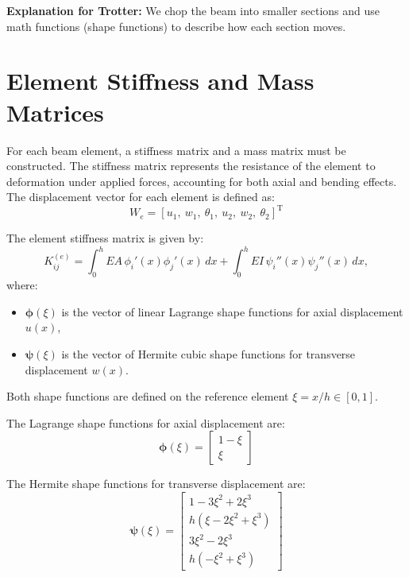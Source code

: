 \documentclass{article}
\begin{document}
	\textbf{Explanation for Trotter:} We chop the beam into smaller sections and use math functions (shape functions) to describe how each section moves.
	
	\section*{Element Stiffness and Mass Matrices}
	
	For each beam element, a stiffness matrix and a mass matrix must be constructed. The stiffness matrix represents the resistance of the element to deformation under applied forces, accounting for both axial and bending effects. The displacement vector for each element is defined as:
	\[
	W_e = [u_1,\ w_1,\ \theta_1,\ u_2,\ w_2,\ \theta_2]^{\mathrm{T}}
	\]
	
	The element stiffness matrix is given by:
	\begin{equation}
		K_{ij}^{(e)} = \int_0^h EA\, \phi_i'(x) \phi_j'(x)\, dx + \int_0^h EI\, \psi_i''(x) \psi_j''(x)\, dx,
	\end{equation}
	where:
	\begin{itemize}
		\item \( \bm{\phi}(\xi) \) is the vector of linear Lagrange shape functions for axial displacement \( u(x) \),
		\item \( \bm{\psi}(\xi) \) is the vector of Hermite cubic shape functions for transverse displacement \( w(x) \).
	\end{itemize}
	
	Both shape functions are defined on the reference element \( \xi = x/h \in [0,1] \).
	
	The Lagrange shape functions for axial displacement are:
	\begin{equation}
		\bm{\phi}(\xi) = 
		\begin{bmatrix}
			1 - \xi \\
			\xi
		\end{bmatrix}
	\end{equation}
	
	The Hermite shape functions for transverse displacement are:
	\begin{equation}
		\bm{\psi}(\xi) =
		\begin{bmatrix}
			1 - 3\xi^2 + 2\xi^3 \\
			h(\xi - 2\xi^2 + \xi^3) \\
			3\xi^2 - 2\xi^3 \\
			h(-\xi^2 + \xi^3)
		\end{bmatrix}
	\end{equation}
	
\end{document}
